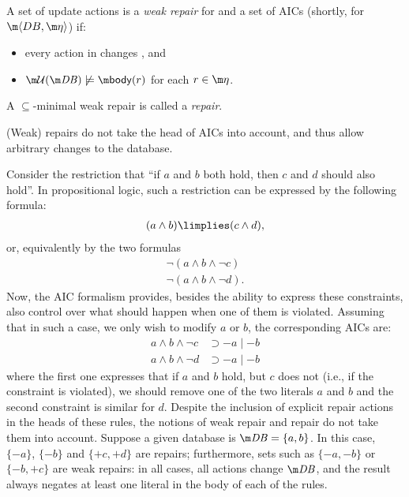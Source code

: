 \begin{definition}
 A set of update actions \UU is a \emph{weak repair} for \db and a set \aics of AICs (shortly, for $\fulldb$) if:
 \begin{itemize}
  \item every action in \UU changes \db, and 
  \item $\UU(\db)\not\models \body(r)$ for each $r\in\aics$.
 \end{itemize}
A $\subseteq$-minimal weak repair is called a \emph{repair}.
\end{definition}

(Weak) repairs do not take the head of AICs into account, and thus allow arbitrary changes to the database.

\begin{example}
  \label{ex:repairs}
  Consider the restriction that ``if $a$ and $b$ both hold, then $c$ and $d$ should also hold''. 
  In propositional logic, such a restriction can be expressed by the following formula:
  \begin{align*}
   (a \land b) \limplies (c \land d),
  \end{align*}
  or, equivalently by the two formulas 
  \begin{align*}
   \lnot(a \land b\land \neg c)\\
   \lnot(a \land b\land \lnot d).
  \end{align*}
  Now, the AIC formalism provides, besides the ability to express these constraints, also control over what should happen when one of them is violated. 
  Assuming that in such a case, we only wish to modify $a$ or $b$, the corresponding AICs are: 
  \begin{align*}
    a\land b\land\neg c &\supset -a\mid -b\\    
    a\land b\land\neg d &\supset -a\mid -b
  \end{align*}
  where the first one expresses that if $a$ and $b$ hold, but $c$ does not (i.e., if the constraint is violated), we should remove one of the two literals $a$ and $b$ and the second constraint is similar for $d$.
  Despite the inclusion of explicit repair actions in the heads of these rules, the notions of weak repair and repair do not take them into account.
  Suppose a given database is $\db=\{a,b\}$.
  In this case, $\{{-a}\}$, $\{{-b}\}$ and $\{{+c},{+d}\}$ are repairs; furthermore, sets such as $\{{-a},{-b}\}$ or $\{{-b},{+c}\}$ are weak repairs: in all cases, all actions change $\db$, and the result always negates at least one literal in the body of each of the rules.


\end{example}
